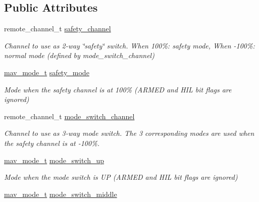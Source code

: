 \subsection*{Public Attributes}
\begin{DoxyCompactItemize}
\item 
\hypertarget{structremote__mode__t_ab12fa91de9f84e52436ba5fe19adba49}{remote\+\_\+channel\+\_\+t \hyperlink{structremote__mode__t_ab12fa91de9f84e52436ba5fe19adba49}{safety\+\_\+channel}}\label{structremote__mode__t_ab12fa91de9f84e52436ba5fe19adba49}

\begin{DoxyCompactList}\small\item\em Channel to use as 2-\/way \char`\"{}safety\char`\"{} switch. When 100\%\+: safety mode, When -\/100\%\+: normal mode (defined by mode\+\_\+switch\+\_\+channel) \end{DoxyCompactList}\item 
\hypertarget{structremote__mode__t_a91cbeb2219e014ad982f91cf0a2f81ae}{\hyperlink{unionmav__mode__t}{mav\+\_\+mode\+\_\+t} \hyperlink{structremote__mode__t_a91cbeb2219e014ad982f91cf0a2f81ae}{safety\+\_\+mode}}\label{structremote__mode__t_a91cbeb2219e014ad982f91cf0a2f81ae}

\begin{DoxyCompactList}\small\item\em Mode when the safety channel is at 100\% (A\+R\+M\+E\+D and H\+I\+L bit flags are ignored) \end{DoxyCompactList}\item 
\hypertarget{structremote__mode__t_a8202a7c96111e16e73f80b1592bab34c}{remote\+\_\+channel\+\_\+t \hyperlink{structremote__mode__t_a8202a7c96111e16e73f80b1592bab34c}{mode\+\_\+switch\+\_\+channel}}\label{structremote__mode__t_a8202a7c96111e16e73f80b1592bab34c}

\begin{DoxyCompactList}\small\item\em Channel to use as 3-\/way mode switch. The 3 corresponding modes are used when the safety channel is at -\/100\%. \end{DoxyCompactList}\item 
\hypertarget{structremote__mode__t_a71ae9421d75e64aeabc6dc4608af5161}{\hyperlink{unionmav__mode__t}{mav\+\_\+mode\+\_\+t} \hyperlink{structremote__mode__t_a71ae9421d75e64aeabc6dc4608af5161}{mode\+\_\+switch\+\_\+up}}\label{structremote__mode__t_a71ae9421d75e64aeabc6dc4608af5161}

\begin{DoxyCompactList}\small\item\em Mode when the mode switch is U\+P (A\+R\+M\+E\+D and H\+I\+L bit flags are ignored) \end{DoxyCompactList}\item 
\hypertarget{structremote__mode__t_a9feac6002d9c6598c710ac2eb9f9f752}{\hyperlink{unionmav__mode__t}{mav\+\_\+mode\+\_\+t} \hyperlink{structremote__mode__t_a9feac6002d9c6598c710ac2eb9f9f752}{mode\+\_\+switch\+\_\+middle}}\label{structremote__mode__t_a9feac6002d9c6598c710ac2eb9f9f752}


\end{DoxyCompactItemize}
